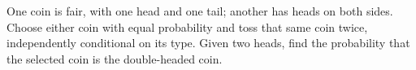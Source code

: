 One coin is fair, with one head and one tail; another has heads on both sides. Choose either coin with equal probability and toss that same coin twice, independently conditional on its type. Given two heads, find the probability that the selected coin is the double-headed coin.
